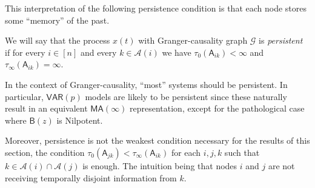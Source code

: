 \documentclass[12pt]{article}
\def\gcg{\mathcal{G}}  %
\def\VAR{\mathsf{VAR}}  %
\def\B{\mathsf{B}}  %
\def\A{\mathsf{A}}  %
\newcommand{\anc}[1]{\mathcal{A}(#1)}  %
\begin{document}
This interpretation of the following persistence condition is that
each node stores some ``memory'' of the past.

\begin{definition}[Persistent]
  We will say that the process $x(t)$ with Granger-causality graph
  $\gcg$ is \textit{persistent} if for every $i \in [n]$ and every
  $k \in \anc{i}$ we have $\tau_0(\A_{ik}) < \infty$ and $\tau_\infty(\A_{ik}) = \infty$.
\end{definition}

\begin{remark}
  In the context of Granger-causality, ``most'' systems should be
  persistent.  In particular, $\mathsf{\VAR}(p)$ models are likely to
  be persistent since these naturally result in an equivalent
  $\mathsf{MA}(\infty)$ representation, except for the pathological
  case where $\B(z)$ is Nilpotent.

  Moreover, persistence is not the weakest condition necessary for the
  results of this section, the condition
  $\tau_0(\A_{jk}) < \tau_\infty(\A_{ik})$ for each $i, j, k$ such that
  $k \in \anc{i} \cap \anc{j}$ is enough.  The intuition being that nodes
  $i$ and $j$ are not receiving temporally disjoint information from
  $k$.

\end{remark}
\end{document}
